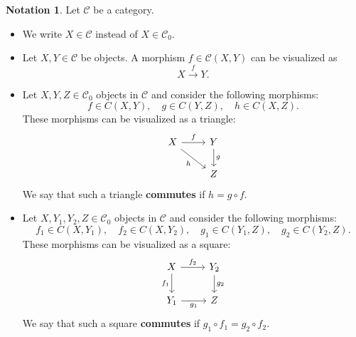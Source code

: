 \documentclass[a4paper,11pt, oneside,titlepage=false]{scrbook}
\theoremstyle{plain}
\theoremstyle{definition}
\newtheorem{intu}[thm]{Intuition}
\newtheorem{nota}[thm]{Notation}
\newcommand{\Cat}[1]{\mathcal{#1}}
\newcommand{\CC}{\Cat{C}}
\newcommand{\Ob}[1]{{#1}_0}
\newcommand{\CHom}[3]{{#1}(#2,#3)}
\newcommand{\co}[2]{\ensuremath{#2 \circ #1}}
\begin{document}

\begin{nota} Let $\CC$ be a category.
\begin{itemize}
\item We write $X\in\CC$ instead of $X\in \Ob{\CC}$. 
\item Let $X,Y\in \CC$ be objects. A morphism $f\in\CHom{\CC}{X}{Y}$ can be visualized as \[ X \xrightarrow{f} Y. \]
\item Let $X,Y, Z \in \Ob{\CC}$ objects in $\CC$ and consider the following morphisms:
\[
f\in\CHom{C}{X}{Y}, \quad g\in\CHom{C}{Y}{Z}, \quad h\in\CHom{C}{X}{Z}.
\]
These morphisms can be visualized as a triangle:
\[
\begin{tikzcd}
X \arrow[r, "f"] \arrow[dr,swap, "h"] & Y \arrow[d, "g"] \\
& Z
\end{tikzcd}
\]
We say that such a triangle \textbf{commutes} if $h = \co{f}{g}$.
\item Let $X,Y_1,Y_2, Z \in \Ob{\CC}$ objects in $\CC$ and consider the following morphisms:
\[
f_1\in\CHom{C}{X}{Y_1}, \quad f_2\in\CHom{C}{X}{Y_2}, \quad g_1\in\CHom{C}{Y_1}{Z}, \quad g_2\in\CHom{C}{Y_2}{Z}.
\]
These morphisms can be visualized as a square:
\[
\begin{tikzcd}
X \arrow[r, "f_2"] \arrow[d,swap, "f_1"] & Y_2 \arrow[d, "g_2"] \\
Y_1 \arrow[r, swap, "g_1"] & Z 
\end{tikzcd}
\]
We say that such a square \textbf{commutes} if $\co{f_1}{g_1} = \co{f_2}{g_2}$.
\end{itemize}
\end{nota}
\end{document}
